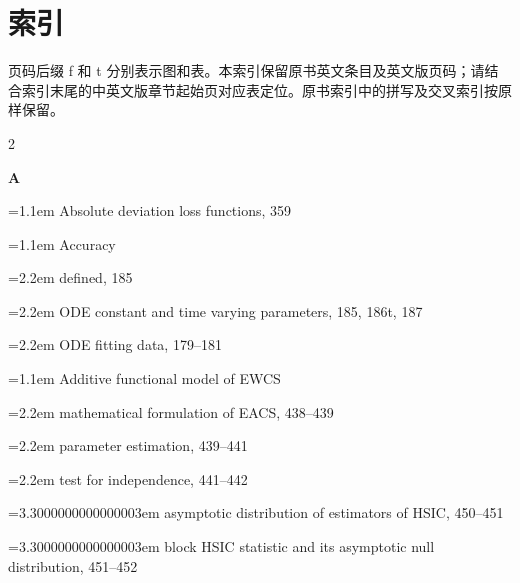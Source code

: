 
\chapter*{索引}
页码后缀 f 和 t 分别表示图和表。本索引保留原书英文条目及英文版页码；请结合索引末尾的中英文版章节起始页对应表定位。原书索引中的拼写及交叉索引按原样保留。

\begingroup
\small\raggedright
\setlength{\parskip}{1pt}
\setlength{\columnsep}{1.6em}
\setlength{\emergencystretch}{2em}
\begin{multicols}{2}

\par{}\medskip\noindent\textbf{A}\par\nobreak\smallskip\nobreak
\noindent\hangindent=1.1em Absolute deviation loss functions, 359\par
\noindent\hangindent=1.1em Accuracy\par
\noindent\hangindent=2.2em \hspace*{1.1em}defined, 185\par
\noindent\hangindent=2.2em \hspace*{1.1em}ODE constant and time varying parameters, 185, 186t, 187\par
\noindent\hangindent=2.2em \hspace*{1.1em}ODE fitting data, 179--181\par
\noindent\hangindent=1.1em Additive functional model of EWCS\par
\noindent\hangindent=2.2em \hspace*{1.1em}mathematical formulation of EACS, 438--439\par
\noindent\hangindent=2.2em \hspace*{1.1em}parameter estimation, 439--441\par
\noindent\hangindent=2.2em \hspace*{1.1em}test for independence, 441--442\par
\noindent\hangindent=3.3000000000000003em \hspace*{2.2em}asymptotic distribution of estimators of HSIC, 450--451\par
\noindent\hangindent=3.3000000000000003em \hspace*{2.2em}block HSIC statistic and its asymptotic null distribution, 451--452\par

\end{multicols}
